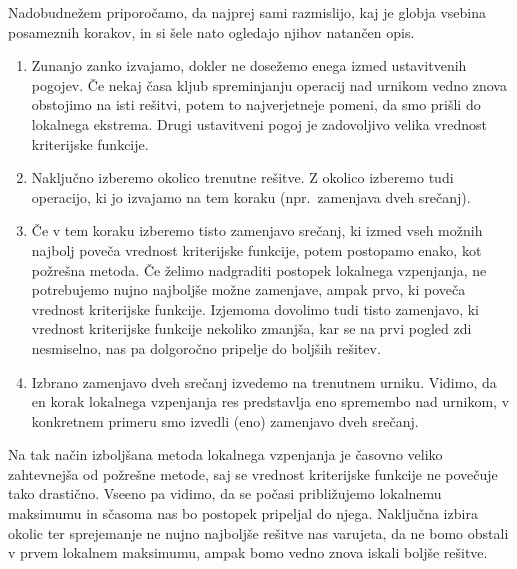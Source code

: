 \documentclass[a4paper,10pt]{article}
\begin{document}
\noindent 
Nadobudnežem priporočamo, da najprej sami razmislijo, kaj je globja vsebina posameznih
korakov, in si šele nato ogledajo njihov natančen opis.

\begin{enumerate}
   \item Zunanjo zanko izvajamo, dokler ne dosežemo enega izmed ustavitvenih pogojev.
   Če nekaj časa kljub spreminjanju operacij nad urnikom vedno znova obstojimo na isti
   rešitvi, potem to najverjetneje pomeni, da smo prišli do lokalnega ekstrema. Drugi
   ustavitveni pogoj je zadovoljivo velika vrednost kriterijske funkcije.
   
   \item Naključno izberemo okolico trenutne rešitve. Z okolico izberemo tudi operacijo,
   ki jo izvajamo na tem koraku (npr.~zamenjava dveh srečanj).
   
   \item Če v tem koraku izberemo tisto zamenjavo srečanj, ki izmed vseh možnih najbolj
   poveča vrednost kriterijske funkcije, potem postopamo enako, kot požrešna metoda. Če
   želimo nadgraditi postopek lokalnega vzpenjanja, ne potrebujemo nujno najboljše možne
   zamenjave, ampak prvo, ki poveča vrednost kriterijske funkcije. Izjemoma dovolimo tudi
   tisto zamenjavo, ki vrednost kriterijske funkcije nekoliko zmanjša, kar se na prvi
   pogled zdi nesmiselno, nas pa dolgoročno pripelje do boljših rešitev.
   
   \item Izbrano zamenjavo dveh srečanj izvedemo na trenutnem urniku. Vidimo, da en korak
   lokalnega vzpenjanja res predstavlja eno spremembo nad urnikom, v konkretnem primeru
   smo izvedli (eno) zamenjavo dveh srečanj.
\end{enumerate}

\noindent
Na tak način izboljšana metoda lokalnega vzpenjanja je časovno veliko zahtevnejša od
požrešne metode, saj se vrednost kriterijske funkcije ne povečuje tako drastično. Vseeno
pa vidimo, da se počasi približujemo lokalnemu maksimumu in sčasoma nas bo postopek
pripeljal do njega. Naključna izbira okolic ter sprejemanje ne nujno najboljše rešitve
nas varujeta, da ne bomo obstali v prvem lokalnem maksimumu, ampak bomo vedno znova
iskali boljše rešitve.
\end{document}
